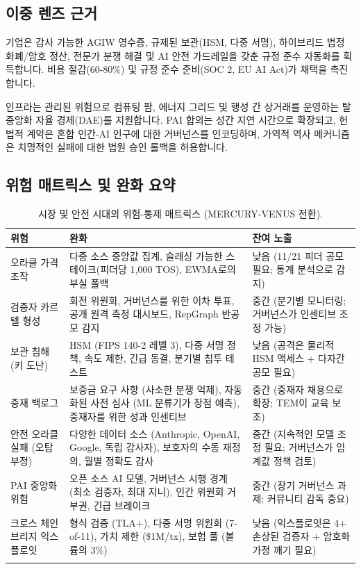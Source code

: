 \documentclass[11pt]{article}
\begin{document}
\subsection{이중 렌즈 근거}
\begin{description}[style=nextline]
  \item[단기(MERCURY 시대)] 기업은 감사 가능한 AGIW 영수증, 규제된 보관(HSM, 다중 서명), 하이브리드 법정 화폐/암호 정산, 전문가 분쟁 해결 및 AI 안전 가드레일을 갖춘 규정 준수 자동화를 획득합니다. 비용 절감(60-80\%) 및 규정 준수 준비(SOC 2, EU AI Act)가 채택을 촉진합니다.
  \item[세기 규모(VENUS부터 ANDROMEDA까지)] 인프라는 관리된 위험으로 컴퓨팅 팜, 에너지 그리드 및 행성 간 상거래를 운영하는 탈중앙화 자율 경제(DAE)를 지원합니다. PAI 합의는 성간 지연 시간으로 확장되고, 헌법적 계약은 혼합 인간-AI 인구에 대한 거버넌스를 인코딩하며, 가역적 역사 메커니즘은 치명적인 실패에 대한 법원 승인 롤백을 허용합니다.
\end{description}

\subsection{위험 매트릭스 및 완화 요약}
\begin{longtable}{@{}p{}p{}p{}@{}}
\toprule
\textbf{위험} & \textbf{완화} & \textbf{잔여 노출} \\\midrule
오라클 가격 조작 & 다중 소스 중앙값 집계, 슬래싱 가능한 스테이크(피더당 1,000 TOS), EWMA로의 부실 폴백 & 낮음 (11/21 피더 공모 필요; 통계 분석으로 감지) \\
검증자 카르텔 형성 & 회전 위원회, 거버넌스를 위한 이차 투표, 공개 원격 측정 대시보드, RepGraph 반공모 감지 & 중간 (분기별 모니터링; 거버넌스가 인센티브 조정 가능) \\
보관 침해 (키 도난) & HSM (FIPS 140-2 레벨 3), 다중 서명 정책, 속도 제한, 긴급 동결, 분기별 침투 테스트 & 낮음 (공격은 물리적 HSM 액세스 + 다자간 공모 필요) \\
중재 백로그 & 보증금 요구 사항 (사소한 분쟁 억제), 자동화된 사전 심사 (ML 분류기가 장점 예측), 중재자를 위한 성과 인센티브 & 중간 (중재자 채용으로 확장; TEM이 교육 보조) \\
안전 오라클 실패 (오탐 부정) & 다양한 데이터 소스 (Anthropic, OpenAI, Google, 독립 감사자), 보호자의 수동 재정의, 월별 정확도 감사 & 중간 (지속적인 모델 조정 필요; 거버넌스가 임계값 정책 검토) \\
PAI 중앙화 위험 & 오픈 소스 AI 모델, 거버넌스 시행 경계 (최소 검증자, 최대 지니), 인간 위원회 거부권, 긴급 브레이크 & 중간 (장기 거버넌스 과제; 커뮤니티 감독 중요) \\
크로스 체인 브리지 익스플로잇 & 형식 검증 (TLA+), 다중 서명 위원회 (7-of-11), 가치 제한 (\$1M/tx), 보험 풀 (볼륨의 3\%) & 낮음 (익스플로잇은 4+ 손상된 검증자 + 암호화 가정 깨기 필요) \\\bottomrule
\caption{시장 및 안전 시대의 위험-통제 매트릭스 (MERCURY-VENUS 전환).}
\label{tab:risk-markets-expanded}
\end{longtable}
\end{document}

